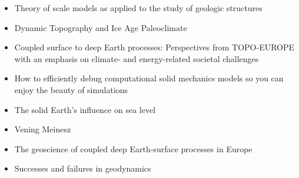 \begin{itemize}
\item Theory of scale models as applied to the study of geologic structures \cite{hubb37}
\item Dynamic Topography and Ice Age Paleoclimate \cite{miac20}
\item Coupled surface to deep Earth processes: Perspectives from TOPO-EUROPE
with an emphasis on climate- and energy-related societal challenges \cite{clsk23}
\item How to efficiently debug computational solid mechanics models so
you can enjoy the beauty of simulations \cite{copb23}
\item The solid Earth's influence on sea level \cite{conr13}  
\item Vening Meinesz \cite{vlaa89}
\item The geoscience of coupled deep Earth-surface processes in Europe \cite{clzb07}
\item Successes and failures in geodynamics \cite{jaco01}
\end{itemize}






